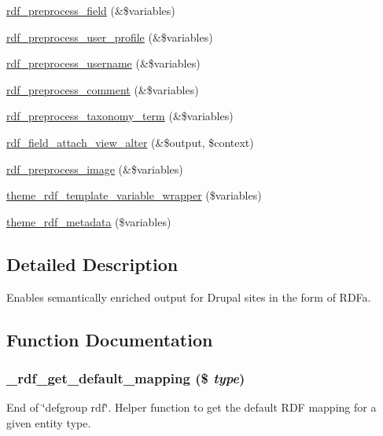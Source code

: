 \begin{DoxyCompactItemize}
\item 
\hyperlink{rdf_8module_ae9c71899b7a78b1f00a399b2c94bc020}{rdf\_\-preprocess\_\-field} (\&\$variables)
\item 
\hyperlink{rdf_8module_a327532324d4f954a6d425729c4c4a582}{rdf\_\-preprocess\_\-user\_\-profile} (\&\$variables)
\item 
\hyperlink{rdf_8module_a2bf9ffa91fb6efaeb2d6c8cf23b21d07}{rdf\_\-preprocess\_\-username} (\&\$variables)
\item 
\hyperlink{rdf_8module_aa3c09f2ba4944d2e527c029169023cf7}{rdf\_\-preprocess\_\-comment} (\&\$variables)
\item 
\hyperlink{rdf_8module_aaaad82981045140598f985efaf655c48}{rdf\_\-preprocess\_\-taxonomy\_\-term} (\&\$variables)
\item 
\hyperlink{rdf_8module_ab7112f10957a10089be7652414648ada}{rdf\_\-field\_\-attach\_\-view\_\-alter} (\&\$output, \$context)
\item 
\hyperlink{rdf_8module_ad2184c38430ea63d16631cbde524e211}{rdf\_\-preprocess\_\-image} (\&\$variables)
\item 
\hyperlink{group__rdf_ga3bb0346c634262f7b193957cc26d38ca}{theme\_\-rdf\_\-template\_\-variable\_\-wrapper} (\$variables)
\item 
\hyperlink{group__rdf_ga74f92e91794fd4f2fcb9abfd777a5955}{theme\_\-rdf\_\-metadata} (\$variables)
\end{DoxyCompactItemize}


\subsection{Detailed Description}
Enables semantically enriched output for Drupal sites in the form of RDFa. 

\subsection{Function Documentation}
\hypertarget{rdf_8module_acdafad7b66bf41db77c4039e2953053f}{
\subsubsection[{\_\-rdf\_\-get\_\-default\_\-mapping}]{\setlength{\rightskip}{0pt plus 5cm}\_\-rdf\_\-get\_\-default\_\-mapping (\$ {\em type})}}
\label{rdf_8module_acdafad7b66bf41db77c4039e2953053f}
End of \char`\"{}defgroup rdf\char`\"{}. Helper function to get the default RDF mapping for a given entity type.


